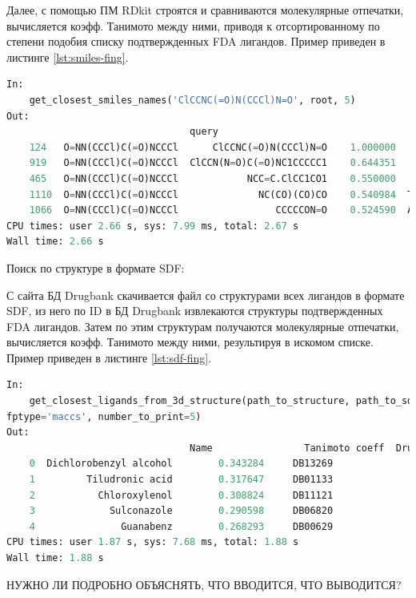 \documentclass[a4paper,14pt]{article}         %
\begin{document}
Далее, с помощью ПМ RDkit строятся и сравниваются молекулярные отпечатки, вычисляется коэфф. Танимото между ними, приводя к отсортированному по степени подобия списку подтвержденных FDA лигандов. Пример приведен в листинге \ref{lst:smiles-fing}.

\begin{lstlisting}[language=Python, label={lst:smiles-fing}, caption={Сходство лигандов по текстовым молекулярным отпечаткам с помощью ПМ RDkit для входных данных~--- SMILES структуры молекулы.}]
In:
	get_closest_smiles_names('ClCCNC(=O)N(CCCl)N=O', root, 5)
Out:
								query       							smiles  			similarity     	 name
	124   O=NN(CCCl)C(=O)NCCCl      ClCCNC(=O)N(CCCl)N=O    1.000000    Carmustine
	919   O=NN(CCCl)C(=O)NCCCl  ClCCN(N=O)C(=O)NC1CCCCC1    0.644351     Lomustine
	465   O=NN(CCCl)C(=O)NCCCl            NCC=C.ClCC1CO1    0.550000     Sevelamer
	1110  O=NN(CCCl)C(=O)NCCCl              NC(CO)(CO)CO    0.540984  Tromethamine
	1066  O=NN(CCCl)C(=O)NCCCl                 CCCCCON=O    0.524590  Amyl Nitrite
CPU times: user 2.66 s, sys: 7.99 ms, total: 2.67 s
Wall time: 2.66 s
\end{lstlisting}

Поиск по структуре в формате SDF:

С сайта БД Drugbank скачивается файл со структурами всех лигандов в формате SDF, из него по ID в БД Drugbank извлекаются структуры подтвержденных FDA лигандов. Затем по этим структурам получаются молекулярные отпечатки, вычисляется коэфф. Танимото между ними, результируя в искомом списке. Пример приведен в листинге \ref{lst:sdf-fing}.

\begin{lstlisting}[language=Python, label={lst:sdf-fing}, caption={Сходство лигандов по топологическим молекулярным отпечаткам с помощью ПМ Open Babel для входных данных~--- SDF структуры молекулы.}]
In: 
	get_closest_ligands_from_3d_structure(path_to_structure, path_to_sdf_approved, root,
fptype='maccs', number_to_print=5)
Out:
								Name  				Tanimoto coeff 	Drugbank ID  	Fingerprint_type
	0  Dichlorobenzyl alcohol        0.343284     DB13269              fp2
	1         Tiludronic acid        0.317647     DB01133              fp2
	2           Chloroxylenol        0.308824     DB11121              fp2
	3             Sulconazole        0.290598     DB06820              fp2
	4               Guanabenz        0.268293     DB00629              fp2
CPU times: user 1.87 s, sys: 7.68 ms, total: 1.88 s
Wall time: 1.88 s
\end{lstlisting}
\color{orange} НУЖНО ЛИ ПОДРОБНО ОБЪЯСНЯТЬ, ЧТО ВВОДИТСЯ, ЧТО ВЫВОДИТСЯ?
\color{black}
\end{document}
